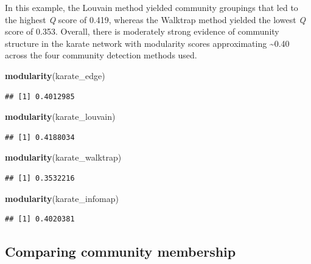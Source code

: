 \documentclass[
]{book}
\newenvironment{Shaded}{\begin{snugshade}}{\end{snugshade}}
\newcommand{\FunctionTok}[1]{\textcolor[rgb]{0.13,0.29,0.53}{\textbf{#1}}}
\newcommand{\NormalTok}[1]{#1}
\begin{document}
In this example, the Louvain method yielded community groupings that led to the highest \emph{Q} score of 0.419, whereas the Walktrap method yielded the lowest \emph{Q} score of 0.353. Overall, there is moderately strong evidence of community structure in the karate network with modularity scores approximating \textasciitilde0.40 across the four community detection methods used.

\begin{Shaded}
\begin{Highlighting}[]
\FunctionTok{modularity}\NormalTok{(karate\_edge)}
\end{Highlighting}
\end{Shaded}

\begin{verbatim}
## [1] 0.4012985
\end{verbatim}

\begin{Shaded}
\begin{Highlighting}[]
\FunctionTok{modularity}\NormalTok{(karate\_louvain)}
\end{Highlighting}
\end{Shaded}

\begin{verbatim}
## [1] 0.4188034
\end{verbatim}

\begin{Shaded}
\begin{Highlighting}[]
\FunctionTok{modularity}\NormalTok{(karate\_walktrap)}
\end{Highlighting}
\end{Shaded}

\begin{verbatim}
## [1] 0.3532216
\end{verbatim}

\begin{Shaded}
\begin{Highlighting}[]
\FunctionTok{modularity}\NormalTok{(karate\_infomap)}
\end{Highlighting}
\end{Shaded}

\begin{verbatim}
## [1] 0.4020381
\end{verbatim}

\subsection{Comparing community membership}\label{comparing-community-membership}
\end{document}
